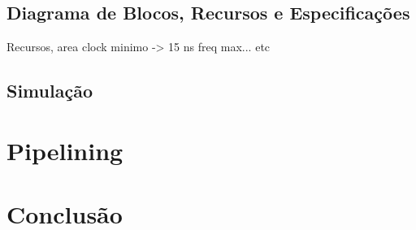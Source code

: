 \documentclass{article} %
\begin{document}
		\subsection{Diagrama de Blocos, Recursos e Especificações}
			Recursos, area clock minimo -> 15 ns  freq max... etc

		\subsection{Simulação}

	\section{Pipelining}

	\section{Conclusão}

	
\end{document}
